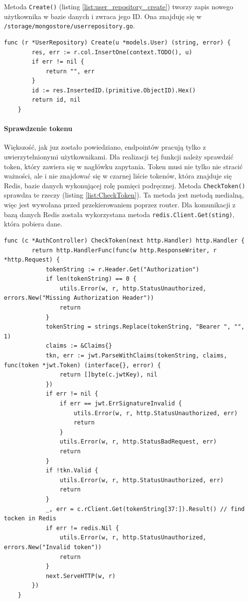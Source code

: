 Metoda \texttt{Create()} (listing \ref{list:user_repository_create}) tworzy zapis nowego użytkownika w bazie danych i zwraca jego ID.
Ona znajduję się w \texttt{/storage/mongostore/userrepository.go}.
\begin{lstlisting}[label=list:user_repository_create,caption=Zachowanie użytkownika do bazy danych,basicstyle=\tiny\ttfamily]
    func (r *UserRepository) Create(u *models.User) (string, error) {
        res, err := r.col.InsertOne(context.TODO(), u)
        if err != nil {
            return "", err
        }
        id := res.InsertedID.(primitive.ObjectID).Hex()
        return id, nil
    }
\end{lstlisting}

\paragraph{Sprawdzenie tokenu\newline}
Większość, jak juz zostało powiedziano, endpointów pracują tylko z uwierzytelnionymi użytkownikami. Dla realizacji tej funkcji należy sprawdzić token, który zawiera się w nagłówku zapytania.
Token musi nie tylko nie stracić ważności, ale i nie znajdować się w czarnej liście tokenów, która znajduje się Redis, bazie danych wykonującej rolę pamięci podręcznej.
Metoda \texttt{CheckToken()} sprawdza te rzeczy (listing \ref{list:CheckToken}). Ta metoda jest metodą medialną, więc jest wywołana przed przekierowaniem poprzez router. Dla komunikacji z bazą danych Redis została wykorzystana metoda \texttt{redis.Client.Get(sting)}, która pobiera dane.
\begin{lstlisting}[label=list:CheckToken,caption=Walidacja JWT tokena,basicstyle=\tiny\ttfamily]
    func (c *AuthController) CheckToken(next http.Handler) http.Handler {
        return http.HandlerFunc(func(w http.ResponseWriter, r *http.Request) {
            tokenString := r.Header.Get("Authorization")
            if len(tokenString) == 0 {
                utils.Error(w, r, http.StatusUnauthorized, errors.New("Missing Authorization Header"))
                return
            }
            tokenString = strings.Replace(tokenString, "Bearer ", "", 1)
            claims := &Claims{}
            tkn, err := jwt.ParseWithClaims(tokenString, claims, func(token *jwt.Token) (interface{}, error) {
                return []byte(c.jwtKey), nil
            })
            if err != nil {
                if err == jwt.ErrSignatureInvalid {
                    utils.Error(w, r, http.StatusUnauthorized, err)
                    return
                }
                utils.Error(w, r, http.StatusBadRequest, err)
                return
            }
            if !tkn.Valid {
                utils.Error(w, r, http.StatusUnauthorized, err)
                return
            }
            _, err = c.rClient.Get(tokenString[37:]).Result() // find tocken in Redis
            if err != redis.Nil {
                utils.Error(w, r, http.StatusUnauthorized, errors.New("Invalid token"))
                return
            }
            next.ServeHTTP(w, r)
        })
    }
\end{lstlisting}

